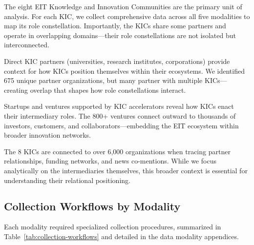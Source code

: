 \documentclass[../main.tex]{subfiles}
\begin{document}
\begin{description}[leftmargin=0.5cm, itemsep=0.3em]
\item[Core -- 8 KICs] The eight EIT Knowledge and Innovation Communities are the primary unit of analysis. For each KIC, we collect comprehensive data across all five modalities to map its role constellation. Importantly, the KICs share some partners and operate in overlapping domains---their role constellations are not isolated but interconnected.

\item[Inner -- Partners] Direct KIC partners (universities, research institutes, corporations) provide context for how KICs position themselves within their ecosystems. We identified 675 unique partner organizations, but many partner with multiple KICs---creating overlap that shapes how role constellations interact.

\item[Outer -- Ventures] Startups and ventures supported by KIC accelerators reveal how KICs enact their intermediary roles. The 800+ ventures connect outward to thousands of investors, customers, and collaborators---embedding the EIT ecosystem within broader innovation networks.

\item[Broader Context] The 8 KICs are connected to over 6,000 organizations when tracing partner relationships, funding networks, and news co-mentions. While we focus analytically on the intermediaries themselves, this broader context is essential for understanding their relational positioning.
\end{description}

\subsection{Collection Workflows by Modality}

Each modality required specialized collection procedures, summarized in Table~\ref{tab:collection-workflows} and detailed in the data modality appendices.
\end{document}
